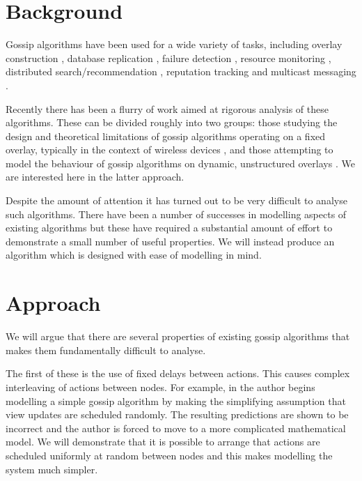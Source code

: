 \documentclass[a4paper,10pt]{article}
\begin{document}
\section{Background}

Gossip algorithms have been used for a wide variety of tasks, including overlay construction \cite{Cyclon}, database replication \cite{database_replication}, failure detection \cite{failure_detection}, resource monitoring \cite{astrolabe}, distributed search/recommendation \cite{tribler}, reputation tracking \cite{reputation} and multicast messaging \cite{multicast}. 

Recently there has been a flurry of work aimed at rigorous analysis of these algorithms. These can be divided roughly into two groups: those studying the design and theoretical limitations of gossip algorithms operating on a fixed overlay, typically in the context of wireless devices \cite{sensorish1, sensorish2}, and those attempting to model the behaviour of gossip algorithms on dynamic, unstructured overlays \cite{generic_theory, mean_field, gossip_prism, correctness, random_scheduling}. We are interested here in the latter approach. 

Despite the amount of attention it has turned out to be very difficult to analyse such algorithms. There have been a number of successes in modelling aspects of existing algorithms \cite{mean_field, gossip_prism, random_scheduling} but these have required a substantial amount of effort to demonstrate a small number of useful properties. We will instead produce an algorithm which is designed with ease of modelling in mind.

\section{Approach}

We will argue that there are several properties of existing gossip algorithms that makes them fundamentally difficult to analyse.

The first of these is the use of fixed delays between actions. This causes complex interleaving of actions between nodes. For example, in \cite{random_scheduling} the author begins modelling a simple gossip algorithm by making the simplifying assumption that view updates are scheduled randomly. The resulting predictions are shown to be incorrect and the author is forced to move to a more complicated mathematical model. We will demonstrate that it is possible to arrange that actions are scheduled uniformly at random between nodes and this makes modelling the system much simpler.
\end{document}
